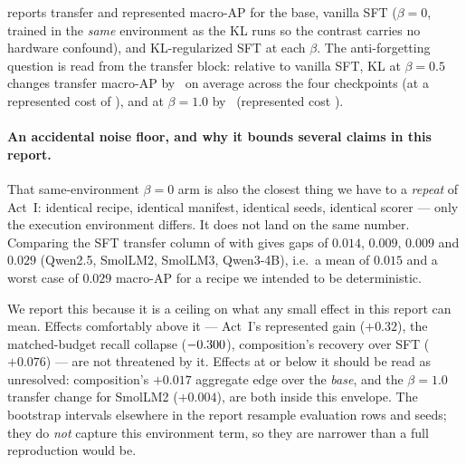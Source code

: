 

 reports transfer and represented macro-AP for the base, vanilla SFT ($\beta=0$, trained in
the \emph{same} environment as the KL runs so the contrast carries no hardware confound), and
KL-regularized SFT at each $\beta$. The anti-forgetting question is read from the transfer block: relative to
vanilla SFT, KL at $\beta=0.5$ changes transfer macro-AP by \KLBetaHalfTransferDelta\ on average across the
four checkpoints (at a represented cost of \KLBetaHalfRepDelta), and at $\beta=1.0$ by
\KLBetaOneTransferDelta\ (represented cost \KLBetaOneRepDelta). \KLVerdictSentence

\paragraph{An accidental noise floor, and why it bounds several claims in this report.} That
same-environment $\beta=0$ arm is also the closest thing we have to a \emph{repeat} of Act~I: identical
recipe, identical manifest, identical seeds, identical scorer --- only the execution environment differs.
It does not land on the same number. Comparing the SFT transfer column of  with
 gives gaps of $0.014$, $0.009$, $0.009$ and $0.029$ (Qwen2.5, SmolLM2, SmolLM3,
Qwen3-4B), i.e.\ a mean of $0.015$ and a worst case of $0.029$ macro-AP for a recipe we intended to be
deterministic.

We report this because it is a ceiling on what any small effect in this report can mean. Effects
comfortably above it --- Act~I's represented gain ($+0.32$), the matched-budget recall collapse
($-0.300$), composition's recovery over SFT ($+0.076$) --- are not threatened by it.
Effects at or below it should be read as unresolved: composition's $+0.017$ aggregate edge over the
\emph{base}, and the $\beta=1.0$ transfer change for SmolLM2 ($+0.004$), are both inside this envelope.
The bootstrap intervals elsewhere in the report resample evaluation rows and seeds; they do \emph{not}
capture this environment term, so they are narrower than a full reproduction would be.

